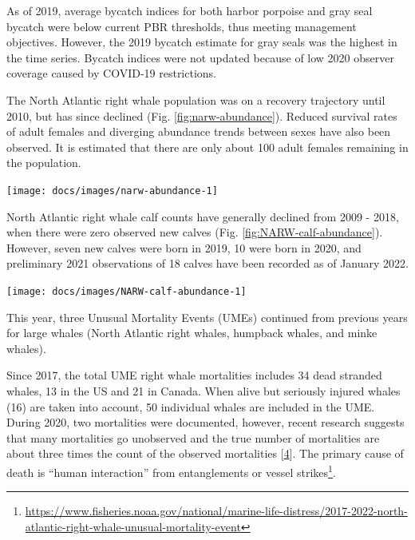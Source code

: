 \documentclass[
  10pt,
]{article}
\let\origfigure\figure
\let\endorigfigure\endfigure
\renewenvironment{figure}[1][2] {
    \expandafter\origfigure\expandafter[H]
} {
    \endorigfigure
}
\begin{document}
As of 2019, average bycatch indices for both harbor porpoise and gray
seal bycatch were below current PBR thresholds, thus meeting management
objectives. However, the 2019 bycatch estimate for gray seals was the
highest in the time series. Bycatch indices were not updated because of
low 2020 observer coverage caused by COVID-19 restrictions.

The North Atlantic right whale population was on a recovery trajectory
until 2010, but has since declined (Fig. \ref{fig:narw-abundance}).
Reduced survival rates of adult females and diverging abundance trends
between sexes have also been observed. It is estimated that there are
only about 100 adult females remaining in the population.

\begin{figure}

{\centering \texttt{[image: docs/images/narw-abundance-1]} 

}

\caption{Estimated North Atlanic right whale abundance on the Northeast Shelf.}\label{fig:narw-abundance}
\end{figure}

North Atlantic right whale calf counts have generally declined from 2009
- 2018, when there were zero observed new calves (Fig.
\ref{fig:NARW-calf-abundance}). However, seven new calves were born in
2019, 10 were born in 2020, and preliminary 2021 observations of 18
calves have been recorded as of January 2022.\\

\begin{figure}

{\centering \texttt{[image: docs/images/NARW-calf-abundance-1]} 

}

\caption{Number of North Atlantic right whale calf births, 1990 - 2021.}\label{fig:NARW-calf-abundance}
\end{figure}

This year, three Unusual Mortality Events (UMEs) continued from previous
years for large whales (North Atlantic right whales, humpback whales,
and minke whales).

Since 2017, the total UME right whale mortalities includes 34 dead
stranded whales, 13 in the US and 21 in Canada. When alive but seriously
injured whales (16) are taken into account, 50 individual whales are
included in the UME. During 2020, two mortalities were documented,
however, recent research suggests that many mortalities go unobserved
and the true number of mortalities are about three times the count of
the observed mortalities
{[}\protect\hyperlink{ref-pace_cryptic_2021}{4}{]}. The primary cause of
death is ``human interaction'' from entanglements or vessel
strikes\footnote{\url{https://www.fisheries.noaa.gov/national/marine-life-distress/2017-2022-north-atlantic-right-whale-unusual-mortality-event}}.
\end{document}
